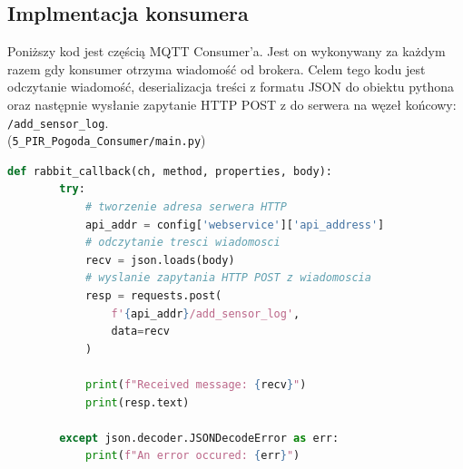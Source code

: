 \documentclass[12pt,a4paper]{article}
\begin{document}
    \subsection{Implmentacja konsumera}
    Poniższy kod jest częścią MQTT Consumer'a. Jest on wykonywany za każdym razem gdy konsumer otrzyma wiadomość od brokera. Celem tego kodu jest odczytanie wiadomość, deserializacja treści z formatu JSON do obiektu pythona oraz następnie wysłanie zapytanie HTTP POST z do serwera na węzeł końcowy: \texttt{/add\_sensor\_log}.\\
    (\texttt{5\_PIR\_Pogoda\_Consumer/main.py})
    \begin{lstlisting}[language=Python]
    def rabbit_callback(ch, method, properties, body):
        try:
            # tworzenie adresa serwera HTTP
            api_addr = config['webservice']['api_address']
            # odczytanie tresci wiadomosci
            recv = json.loads(body)
            # wyslanie zapytania HTTP POST z wiadomoscia
            resp = requests.post(
                f'{api_addr}/add_sensor_log',
                data=recv
            )

            print(f"Received message: {recv}")
            print(resp.text)

        except json.decoder.JSONDecodeError as err:
            print(f"An error occured: {err}")
    \end{lstlisting}

    \pagebreak
\end{document}
